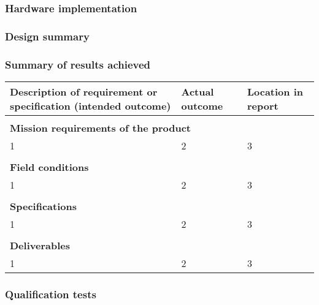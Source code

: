 \subsubsection{Hardware implementation}



\subsubsection{Design summary}


\subsubsection{Summary of results achieved}

\begin{tabular}{|p{5cm}|p{5cm}|p{5cm}|}
\hline
\textbf{Description of requirement or specification
(intended outcome)} & \textbf{Actual outcome}& \textbf{Location in report}\\
\hline
\multicolumn{3}{|l|}{}\\
\multicolumn{3}{|l|}{\textbf{Mission requirements of the product}}\\
\hline
1&2&3\\
\hline
\multicolumn{3}{|l|}{}\\
\multicolumn{3}{|l|}{\textbf{Field conditions}}\\
\hline
1&2&3\\
\hline
\multicolumn{3}{|l|}{}\\
\multicolumn{3}{|l|}{\textbf{Specifications}}\\
\hline
1&2&3\\
\hline
\multicolumn{3}{|l|}{}\\
\multicolumn{3}{|l|}{\textbf{Deliverables}}\\
\hline
1&2&3\\
\hline

\end{tabular}

\subsubsection{Qualification tests}